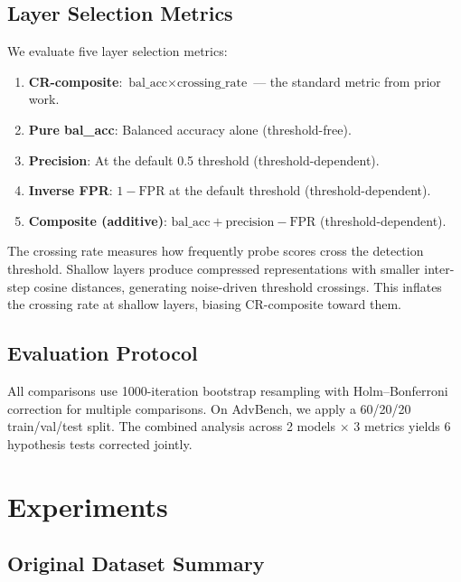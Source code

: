 \documentclass[11pt]{article}
\begin{document}
\subsection{Layer Selection Metrics}
\label{sec:layer-metrics}

We evaluate five layer selection metrics:
\begin{enumerate}
    \item \textbf{CR-composite}: $\text{bal\_acc} \times \text{crossing\_rate}$ --- the standard metric from prior work.
    \item \textbf{Pure bal\_acc}: Balanced accuracy alone (threshold-free).
    \item \textbf{Precision}: At the default 0.5 threshold (threshold-dependent).
    \item \textbf{Inverse FPR}: $1 - \text{FPR}$ at the default threshold (threshold-dependent).
    \item \textbf{Composite (additive)}: $\text{bal\_acc} + \text{precision} - \text{FPR}$ (threshold-dependent).
\end{enumerate}

The crossing rate measures how frequently probe scores cross the detection threshold. Shallow layers produce compressed representations with smaller inter-step cosine distances, generating noise-driven threshold crossings. This inflates the crossing rate at shallow layers, biasing CR-composite toward them.

\subsection{Evaluation Protocol}

All comparisons use 1000-iteration bootstrap resampling with Holm--Bonferroni correction for multiple comparisons. On AdvBench, we apply a 60/20/20 train/val/test split. The combined analysis across 2 models $\times$ 3 metrics yields 6 hypothesis tests corrected jointly.

\section{Experiments}
\label{sec:experiments}

\subsection{Original Dataset Summary}
\end{document}
